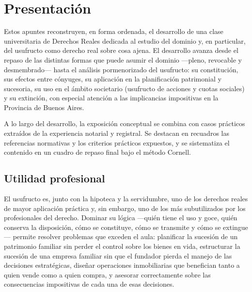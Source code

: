 \documentclass[12pt,oneside]{book}
\begin{document}
\tableofcontents

\chapter*{Presentación}

Estos apuntes reconstruyen, en forma ordenada, el desarrollo de una clase universitaria de Derechos Reales dedicada al estudio del dominio y, en particular, del usufructo como derecho real sobre cosa ajena. El desarrollo avanza desde el repaso de las distintas formas que puede asumir el dominio ---pleno, revocable y desmembrado--- hasta el análisis pormenorizado del usufructo: su constitución, sus efectos entre cónyuges, su aplicación en la planificación patrimonial y sucesoria, su uso en el ámbito societario (usufructo de acciones y cuotas sociales) y su extinción, con especial atención a las implicancias impositivas en la Provincia de Buenos Aires.

A lo largo del desarrollo, la exposición conceptual se combina con casos prácticos extraídos de la experiencia notarial y registral. Se destacan en recuadros las referencias normativas y los criterios prácticos expuestos, y se sistematiza el contenido en un cuadro de repaso final bajo el método Cornell.

\section*{Utilidad profesional}

El usufructo es, junto con la hipoteca y la servidumbre, uno de los derechos reales de mayor aplicación práctica y, sin embargo, uno de los más subutilizados por los profesionales del derecho. Dominar su lógica ---quién tiene el uso y goce, quién conserva la disposición, cómo se constituye, cómo se transmite y cómo se extingue--- permite resolver problemas que exceden el aula: planificar la sucesión de un patrimonio familiar sin perder el control sobre los bienes en vida, estructurar la sucesión de una empresa familiar sin que el fundador pierda el manejo de las decisiones estratégicas, diseñar operaciones inmobiliarias que benefician tanto a quien vende como a quien compra, y asesorar correctamente sobre las consecuencias impositivas de cada una de esas decisiones.
\end{document}
